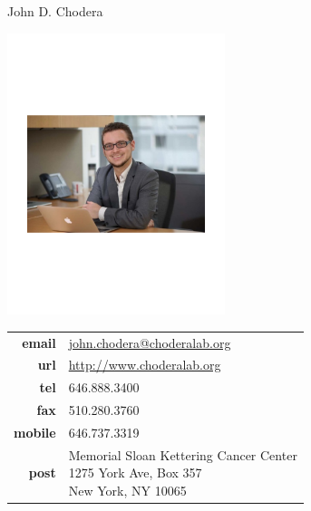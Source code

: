 \documentclass[10pt]{article}
\begin{document}
\reversemarginpar
{\selectfont \LARGE John D. Chodera}\\[1cm]

\begin{minipage}[t]{2.5in}
\includegraphics[width=2.5in,valign=c]{images/john_chodera_wide.pdf}
\end{minipage}
\quad
\begin{minipage}[t]{3in}
\begin{tabular}{rl}
{\bf email} & \href{mailto:choderaj@mskcc.org}{\href{mailto:john.chodera@choderalab.org}{john.chodera@choderalab.org}}\\
{\bf url} & \href{http://www.choderalab.org}{\href{http://www.choderalab.org}{http://www.choderalab.org}}\\[0.05in]
{\bf tel} & 646.888.3400\\[0.05in]
{\bf fax} & 510.280.3760 \\[0.05in]
{\bf mobile} & 646.737.3319\\[0.05in]
{\bf post} & 
\parbox[t]{3.0in}{Memorial Sloan Kettering Cancer Center\\
1275 York Ave, Box 357\\
New York, NY 10065}
\end{tabular}
\end{minipage}

\end{document}
